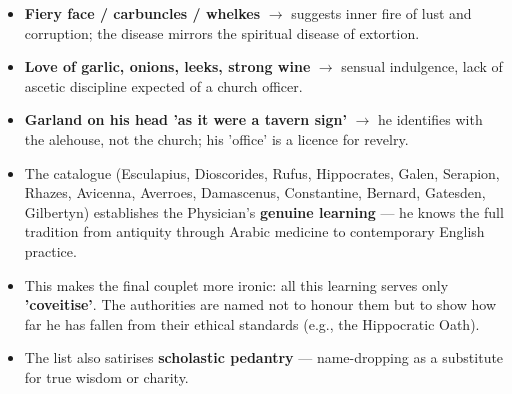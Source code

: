 \documentclass[11pt]{article}
\begin{document}
\begin{corrige}[Exercise 1]
\begin{itemize}
\item \textbf{Fiery face / carbuncles / whelkes} $\rightarrow$ suggests inner fire of lust and corruption; the disease mirrors the spiritual disease of extortion.
\item \textbf{Love of garlic, onions, leeks, strong wine} $\rightarrow$ sensual indulgence, lack of ascetic discipline expected of a church officer.
\item \textbf{Garland on his head 'as it were a tavern sign'} $\rightarrow$ he identifies with the alehouse, not the church; his 'office' is a licence for revelry.
\end{itemize}
\end{corrige}

\begin{corrige}[Exercise 5]
\begin{itemize}
\item The catalogue (Esculapius, Dioscorides, Rufus, Hippocrates, Galen, Serapion, Rhazes, Avicenna, Averroes, Damascenus, Constantine, Bernard, Gatesden, Gilbertyn) establishes the Physician's \textbf{genuine learning} — he knows the full tradition from antiquity through Arabic medicine to contemporary English practice.
\item This makes the final couplet more ironic: all this learning serves only \textbf{'coveitise'}. The authorities are named not to honour them but to show how far he has fallen from their ethical standards (e.g., the Hippocratic Oath).
\item The list also satirises \textbf{scholastic pedantry} — name-dropping as a substitute for true wisdom or charity.
\end{itemize}
\end{corrige}
\end{document}
